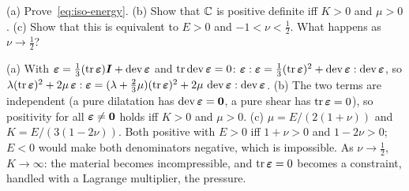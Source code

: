 \label{exo:posdef}
%
(a) Prove~\eqref{eq:iso-energy}. (b) Show that $\mathbb{C}$ is positive definite iff
$K>0$ and $\mu>0$. (c) Show that this is equivalent to $E>0$ and
$-1<\nu<\tfrac12$. What happens as $\nu\to\tfrac12$?
\begin{solution}
(a) With $\bm{\varepsilon}=\tfrac13(\operatorname{tr}\bm{\varepsilon})\bm{I}+\operatorname{dev}\bm{\varepsilon}$ and $\operatorname{tr}\operatorname{dev}\bm{\varepsilon}=0$:
$\bm{\varepsilon}:\bm{\varepsilon}=\tfrac13(\operatorname{tr}\bm{\varepsilon})^2+\operatorname{dev}\bm{\varepsilon}:\operatorname{dev}\bm{\varepsilon}$, so
$\lambda(\operatorname{tr}\bm{\varepsilon})^2+2\mu\,\bm{\varepsilon}:\bm{\varepsilon}=(\lambda+\tfrac23\mu)(\operatorname{tr}\bm{\varepsilon})^2+2\mu\,\operatorname{dev}\bm{\varepsilon}:\operatorname{dev}\bm{\varepsilon}$.
(b) The two terms are independent (a pure dilatation has $\operatorname{dev}\bm{\varepsilon}=\bm{0}$,
a pure shear has $\operatorname{tr}\bm{\varepsilon}=0$), so positivity for all $\bm{\varepsilon}\ne\bm{0}$ holds iff
$K>0$ and $\mu>0$.
(c) $\mu=E/(2(1+\nu))$ and $K=E/(3(1-2\nu))$. Both positive with $E>0$ iff
$1+\nu>0$ and $1-2\nu>0$; $E<0$ would make both denominators negative, which is
impossible. As $\nu\to\tfrac12$, $K\to\infty$: the material becomes
incompressible, and $\operatorname{tr}\bm{\varepsilon}=0$ becomes a constraint, handled with a Lagrange
multiplier, the pressure.
\end{solution}

